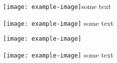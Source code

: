 \texttt{[image: example-image]}some text

\texttt{[image: example-image]} some text

\texttt{[image: example-image]} %

\texttt{[image: example-image]}  some text
